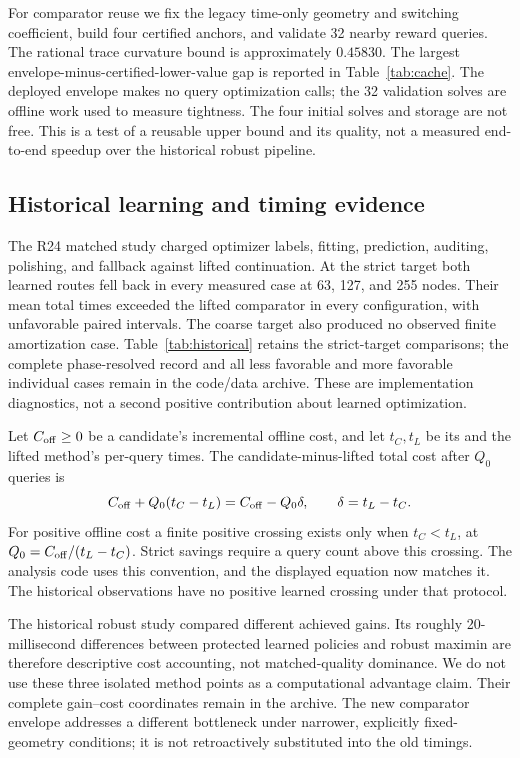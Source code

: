 \documentclass[11pt,letterpaper]{article}
\theoremstyle{definition}\newtheorem{assumption}[theorem]{Assumption}
\begin{document}
For comparator reuse we fix the legacy time-only geometry and switching coefficient, build four certified anchors, and validate 32 nearby reward queries. The rational trace curvature bound is approximately $0.45830$. The largest envelope-minus-certified-lower-value gap is reported in Table~\ref{tab:cache}. The deployed envelope makes no query optimization calls; the 32 validation solves are offline work used to measure tightness. The four initial solves and storage are not free. This is a test of a reusable upper bound and its quality, not a measured end-to-end speedup over the historical robust pipeline.


\subsection{Historical learning and timing evidence}
The R24 matched study charged optimizer labels, fitting, prediction, auditing, polishing, and fallback against lifted continuation. At the strict target both learned routes fell back in every measured case at 63, 127, and 255 nodes. Their mean total times exceeded the lifted comparator in every configuration, with unfavorable paired intervals. The coarse target also produced no observed finite amortization case. Table~\ref{tab:historical} retains the strict-target comparisons; the complete phase-resolved record and all less favorable and more favorable individual cases remain in the code/data archive. These are implementation diagnostics, not a second positive contribution about learned optimization.

Let $C_{\rm off}\geq0$ be a candidate's incremental offline cost, and let $t_C,t_L$ be its and the lifted method's per-query times. The candidate-minus-lifted total cost after $Q_0$ queries is
\begin{equation}\label{eq:amortization}
 C_{\rm off}+Q_0(t_C-t_L)=C_{\rm off}-Q_0\delta,
 \qquad \delta=t_L-t_C.
\end{equation}
For positive offline cost a finite positive crossing exists only when $t_C<t_L$, at $Q_0=C_{\rm off}/(t_L-t_C)$. Strict savings require a query count above this crossing. The analysis code uses this convention, and the displayed equation now matches it. The historical observations have no positive learned crossing under that protocol.


The historical robust study compared different achieved gains. Its roughly 20-millisecond differences between protected learned policies and robust maximin are therefore descriptive cost accounting, not matched-quality dominance. We do not use these three isolated method points as a computational advantage claim. Their complete gain--cost coordinates remain in the archive. The new comparator envelope addresses a different bottleneck under narrower, explicitly fixed-geometry conditions; it is not retroactively substituted into the old timings.
\end{document}
